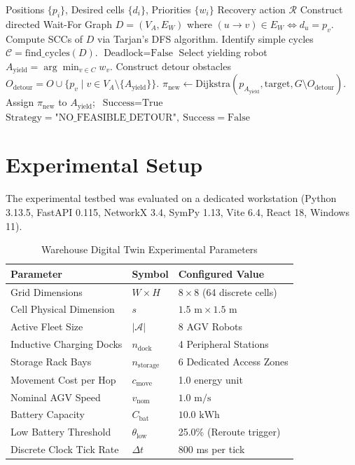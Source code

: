 \documentclass[conference]{IEEEtran}
\begin{document}
\begin{algorithm}
\caption{WFG Cycle Detection and Dijkstra Detour Recovery}
\label{alg:deadlock}
\begin{algorithmic}[1]
\REQUIRE Positions $\{p_i\}$, Desired cells $\{d_i\}$, Priorities $\{w_i\}$
\ENSURE Recovery action $\mathcal{R}$
\STATE Construct directed Wait-For Graph $D = (V_A, E_W)$ where $(u \to v) \in E_W \iff d_u = p_v$.
\STATE Compute SCCs of $D$ via Tarjan's DFS algorithm.
\STATE Identify simple cycles $\mathcal{C} = \text{find\_cycles}(D)$.
    \RETURN $\text{Deadlock} = \text{False}$
\ENDIF
\STATE Select yielding robot $A_{\text{yield}} = \arg\min_{v \in C} w_v$.
\STATE Construct detour obstacles $O_{\text{detour}} = O \cup \{p_v \mid v \in V_A \setminus \{A_{\text{yield}}\}\}$.
\STATE $\pi_{\text{new}} \leftarrow \text{Dijkstra}(p_{A_{\text{yield}}}, \text{target}, G \setminus O_{\text{detour}})$.
    \STATE Assign $\pi_{\text{new}}$ to $A_{\text{yield}}$;\ \RETURN $\text{Success} = \text{True}$
\ELSE
    \RETURN $\text{Strategy} = \text{"NO\_FEASIBLE\_DETOUR"},\ \text{Success} = \text{False}$
\ENDIF
\end{algorithmic}
\end{algorithm}

\section{Experimental Setup}
The experimental testbed was evaluated on a dedicated workstation (Python 3.13.5, FastAPI 0.115, NetworkX 3.4, SymPy 1.13, Vite 6.4, React 18, Windows 11). 

\begin{table}[htbp]
\caption{Warehouse Digital Twin Experimental Parameters}
\label{tab:params}
\begin{center}
\begin{tabular}{lll}
\toprule
\textbf{Parameter} & \textbf{Symbol} & \textbf{Configured Value} \\
\midrule
Grid Dimensions & $W \times H$ & $8 \times 8$ (64 discrete cells) \\
Cell Physical Dimension & $s$ & $1.5\text{ m} \times 1.5\text{ m}$ \\
Active Fleet Size & $|\mathcal{A}|$ & 8 AGV Robots \\
Inductive Charging Docks & $n_{\text{dock}}$ & 4 Peripheral Stations \\
Storage Rack Bays & $n_{\text{storage}}$ & 6 Dedicated Access Zones \\
Movement Cost per Hop & $c_{\text{move}}$ & 1.0 energy unit \\
Nominal AGV Speed & $v_{\text{nom}}$ & $1.0\text{ m/s}$ \\
Battery Capacity & $C_{\text{bat}}$ & $10.0\text{ kWh}$ \\
Low Battery Threshold & $\theta_{\text{low}}$ & 25.0\% (Reroute trigger) \\
Discrete Clock Tick Rate & $\Delta t$ & 800 ms per tick \\
\bottomrule
\end{tabular}
\end{center}
\end{table}
\end{document}

